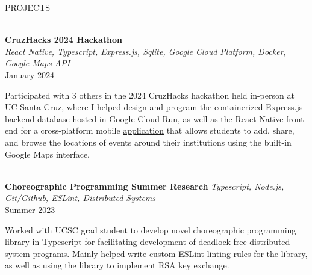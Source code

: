 \documentclass[letterpaper,10pt]{article}
\begin{document}
\begin{multicols*}{2}
  \begin{LARGE} \faTools\hspace{5px} PROJECTS \end{LARGE}
  \vspace{.5em} \\
  {
  \fontsize{11pt}{\baselineskip}\selectfont
  \textbf{CruzHacks 2024 Hackathon}
  }
  \\
  \textit{React Native, Typescript, Express.js, Sqlite, Google Cloud Platform, Docker, Google Maps API} \\
  January 2024
  \vspace{5px} \\
  \begin{minipage}{.5\textwidth}
    \begin{flushleft}
      Participated with 3 others in the 2024 CruzHacks hackathon held in-person at UC Santa Cruz, where I helped design and program the containerized Express.js backend database hosted in Google Cloud Run, as well as the React Native front end for a cross-platform mobile \href{https://devpost.com/software/studybuddy-vmk5xi}{application} that allows students to add, share, and browse the locations of events around their institutions using the built-in Google Maps interface.
    \end{flushleft}
  \end{minipage}
  \vspace{.5em} \\
  {
  \fontsize{10.5pt}{\baselineskip}\selectfont
  \textbf{Choreographic Programming Summer Research}
  }
  \textit{Typescript, Node.js, Git/Github, ESLint, Distributed Systems} \\
  Summer 2023
  \vspace{5px} \\
  \begin{minipage}{.5\textwidth}
    \begin{flushleft}
      Worked with UCSC grad student to develop novel choreographic programming \href{https://github.com/ImpregnableProgrammer/choreography-ts-RK-work}{library} in Typescript for facilitating development of deadlock-free distributed system programs. Mainly helped write custom ESLint linting rules for the library, as well as using the library to implement RSA key exchange.
    \end{flushleft}
  \end{minipage}
  \columnbreak \\

\end{multicols*}
\end{document}
